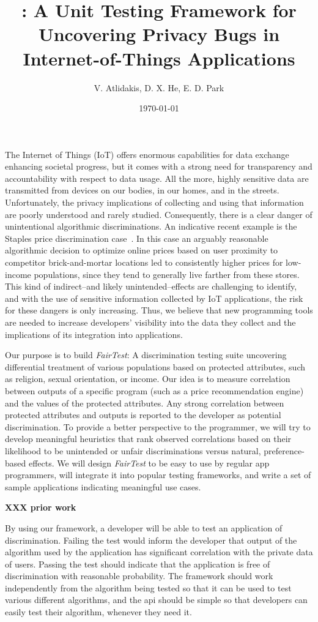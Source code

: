 \documentclass{article}
\title{\thetool: A Unit Testing Framework for Uncovering Privacy Bugs in
  Internet-of-Things Applications}
\author{V. Atlidakis, D. X. He, E. D. Park}
\date{\today}
\newcommand{\thetool}{{\it FairTest}\xspace}
\newcommand{\heading}[1]{\noindent{\bf{#1}}}
\newcommand{\xxx}[1]{\textbf{{XXX} #1}}
\begin{document}
\maketitle

\heading{Motivation.}
The Internet of Things (IoT) offers enormous capabilities for data exchange
enhancing societal progress, but it comes with a strong need for transparency
and accountability with respect to data usage. All the more, highly sensitive
data are transmitted from devices on our bodies, in our homes, and in the
streets. Unfortunately, the privacy implications of collecting and using that
information are poorly understood and rarely studied. Consequently, there is a
clear danger of unintentional algorithmic discriminations. An indicative recent
example is the Staples price discrimination case~\cite{Staples}.
In this case an arguably reasonable algorithmic decision to optimize online
prices based on user proximity to competitor brick-and-mortar locations led to
consistently higher prices for low-income populations, since they tend to
generally live farther from these stores. This kind of indirect--and likely
unintended--effects are challenging to identify, and with the use of sensitive
information collected by IoT applications, the risk for these dangers is only
increasing. Thus, we believe that new programming tools are needed to increase
developers’ visibility into the data they collect and the implications of its
integration into applications.

\heading{Goals.}
Our purpose is to build \thetool: A discrimination testing suite uncovering
differential treatment of various populations based on protected
attributes, such as religion, sexual orientation, or income. Our idea is to
measure correlation between outputs of a specific program (such as a price
recommendation engine) and the values of the protected attributes. Any strong
correlation between protected attributes and outputs is reported to the
developer as potential discrimination. To provide a better perspective to the
programmer, we will try to develop meaningful heuristics that rank observed
correlations based on their likelihood to be unintended or unfair
discriminations versus natural, preference-based effects. We will design
{\it FairTest} to be easy to use by regular app programmers, will integrate it
into popular testing frameworks, and write a set of sample applications
indicating meaningful use cases.

\heading{Prior Experience.}
\xxx{prior work}

\heading{Expected Conclusions.}
By using our framework, a developer will be able to test an application of discrimination. Failing 
the test would inform the developer that output of the algorithm used by the application has 
significant correlation with the private data of users. Passing the test should indicate that the application 
is free of discrimination with reasonable probability. The framework should work independently from 
the algorithm being tested so that it can be used to test various different algorithms, and the api 
should be simple so that developers can easily test their algorithm, whenever they need it.
\end{document}
